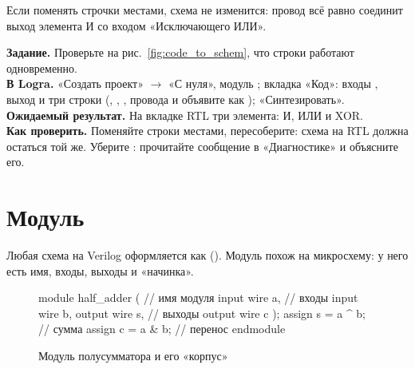Если поменять строчки местами, схема не изменится: провод  всё равно
соединит выход элемента И со входом «Исключающего ИЛИ».

\begin{diybox}
\textbf{Задание.} Проверьте на рис.~\ref{fig:code_to_schem}, что строки  работают одновременно.\\
\textbf{В Logra.} «Создать проект» $\to$ «С нуля», модуль ; вкладка «Код»: входы , выход  и три строки  (, , , провода  и  объявите как ); «Синтезировать».\\
\textbf{Ожидаемый результат.} На вкладке RTL три элемента: И, ИЛИ и XOR.\\
\textbf{Как проверить.} Поменяйте строки местами, пересоберите: схема на RTL должна остаться той же.  Уберите : прочитайте сообщение в «Диагностике» и объясните его.
\end{diybox}

\section{Модуль}

Любая схема на Verilog оформляется как  (). Модуль
похож на микросхему: у него есть имя, входы, выходы и «начинка».

\begin{figure}[H]
\centering
\begin{minipage}{0.52\textwidth}
\begin{vcode}
module half_adder (   // имя модуля
    input  wire a,    // входы
    input  wire b,
    output wire s,    // выходы
    output wire c
);
    assign s = a ^ b; // сумма
    assign c = a & b; // перенос
endmodule
\end{vcode}
\end{minipage}\hfill
\begin{minipage}{0.44\textwidth}
\centering
{}
\end{minipage}
\caption{Модуль полусумматора и его «корпус»}
\end{figure}

